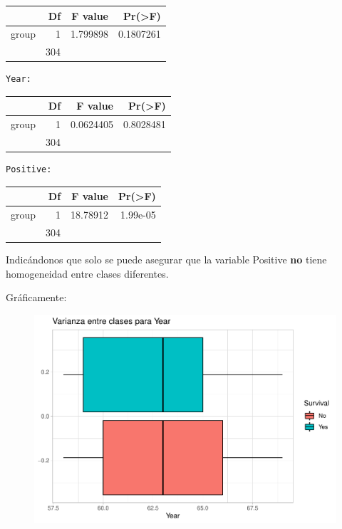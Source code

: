 \begin{tabular}{l|r|r|r}
\hline
  & Df & F value & Pr(>F)\\
\hline
group & 1 & 1.799898 & 0.1807261\\
\hline
 & 304 &  & \\
\hline
\end{tabular}

\begin{verbatim}
Year:
\end{verbatim}

\begin{tabular}{l|r|r|r}
\hline
  & Df & F value & Pr(>F)\\
\hline
group & 1 & 0.0624405 & 0.8028481\\
\hline
 & 304 &  & \\
\hline
\end{tabular}

\begin{verbatim}
Positive:
\end{verbatim}

\begin{tabular}{l|r|r|r}
\hline
  & Df & F value & Pr(>F)\\
\hline
group & 1 & 18.78912 & 1.99e-05\\
\hline
 & 304 &  & \\
\hline
\end{tabular}

Indicándonos que solo se puede asegurar que la variable Positive \textbf{no} tiene homogeneidad entre clases diferentes.

\vspace{\baselineskip}

Gráficamente:

\begin{figure}[H]\center\includegraphics[width=.8\linewidth]{img/Clasificacion_files/figure-latex/unnamed-chunk-17-1}\caption{}\end{figure}

